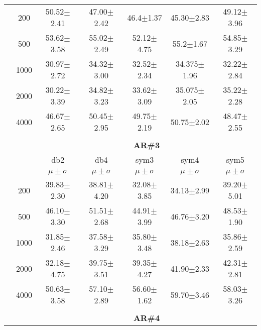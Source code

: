 \begin{table}[H]
\begin{tabular}{|c|c|c c c c c|}
\multicolumn{1}{|c|}{ \multirow{5}{*}{\rotatebox[origin=c]{90}{\textbf{Neurônios}}} }
& 200 &50.52$\pm$2.41	&47.00$\pm$2.42	&46.4$\pm$1.37	&45.30$\pm$2.83		&49.12$\pm$3.96 \\\cline{2-7}
&500  &53.62$\pm$3.58	&55.02$\pm$2.49	&52.12$\pm$4.75	&55.2$\pm$1.67		&54.85$\pm$3.29 \\\cline{2-7}
&1000 &30.97$\pm$2.72	&34.32$\pm$3.00	&32.52$\pm$2.34	&34.375$\pm$1.96	&32.22$\pm$2.84 \\\cline{2-7}
&2000 &30.22$\pm$3.39	&34.82$\pm$3.23	&33.62$\pm$3.09	&35.075$\pm$2.05	&35.22$\pm$2.28 \\\cline{2-7}
&4000 &46.67$\pm$2.65	&50.45$\pm$2.95	&49.75$\pm$2.19	&50.75$\pm$2.02		&48.47$\pm$2.55 \\ \midrule
\multicolumn{7}{c}{}\\ 



\cline{3-7}
\multicolumn{2}{c|}{\multirow{3}{*}{}} & \multicolumn{5}{c|}{\textbf{AR\#3}}   \\\cline{3-7} 

\multicolumn{2}{c|}{}  & db2 & db4 & sym3 & sym4 & sym5 \\\cline{3-7}
\multicolumn{2}{c|}{}& $\mu \pm \sigma$ & $\mu \pm \sigma$ & $\mu \pm \sigma$ & $\mu \pm \sigma$ & $\mu \pm \sigma$ \\\hline

\multicolumn{1}{|c|}{ \multirow{5}{*}{\rotatebox[origin=c]{90}{\textbf{Neurônios}}} }
&200	&39.83$\pm$2.30	&38.81$\pm$4.20	&32.08$\pm$3.85	&34.13$\pm$2.99	&39.20$\pm$5.01\\\cline{2-7} 

&500	&46.10$\pm$3.30	&51.51$\pm$2.68	&44.91$\pm$3.99	&46.76$\pm$3.20	&48.53$\pm$1.90 \\\cline{2-7} 

&1000	&31.85$\pm$2.46	&37.58$\pm$3.29	&35.80$\pm$3.48	&38.18$\pm$2.63	&35.86$\pm$2.59 \\\cline{2-7} 

&2000	&32.18$\pm$4.75	&39.75$\pm$3.51	&39.35$\pm$4.27	&41.90$\pm$2.33	&42.31$\pm$2.81 \\\cline{2-7}

&4000	&50.63$\pm$3.58	&57.10$\pm$2.89	&56.60$\pm$1.62	& 59.70$\pm$3.46&58.03$\pm$3.26 \\\midrule 
\multicolumn{7}{c}{}\\ 



\cline{3-7}
\multicolumn{2}{c|}{\multirow{3}{*}{}} & \multicolumn{5}{c|}{\textbf{AR\#4}}   \\\cline{3-7} 


\end{tabular}
\end{table}
